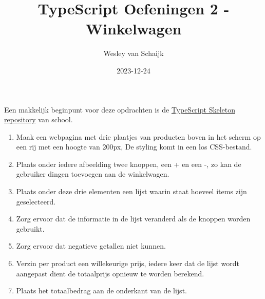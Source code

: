 \documentclass{article}
\title{TypeScript Oefeningen 2 - Winkelwagen}
\author{Wesley van Schaijk}
\date{2023-12-24}
\begin{document}
\maketitle

\paragraph{}
Een makkelijk beginpunt voor deze opdrachten is de \href{https://github.com/HZ-HBO-ICT/ts-skeleton-app}{TypeScript Skeleton repository} van school.

\begin{enumerate}
	\item Maak een webpagina met drie plaatjes van producten boven in het scherm op een rij met een hoogte van 200px, De styling komt in een los CSS-bestand.
	\item Plaats onder iedere afbeelding twee knoppen, een + en een -, zo kan de gebruiker dingen toevoegen aan de winkelwagen.
	\item Plaats onder deze drie elementen een lijst waarin staat hoeveel items zijn geselecteerd.
	\item Zorg ervoor dat de informatie in de lijst veranderd als de knoppen worden gebruikt.
	\item Zorg ervoor dat negatieve getallen niet kunnen.
	\item Verzin per product een willekeurige prijs, iedere keer dat de lijst wordt aangepast dient de totaalprijs opnieuw te worden berekend.
	\item Plaats het totaalbedrag aan de onderkant van de lijst.
\end{enumerate}
\end{document}

